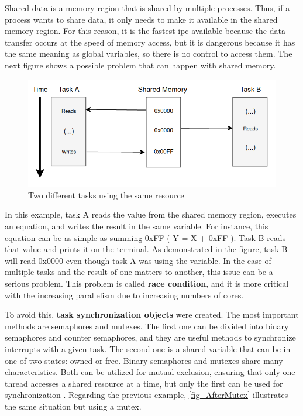 Shared data is a memory region that is shared by multiple processes. Thus, if a process wants to share data, it only needs to make it 
available in the shared memory region. For this reason, it is the fastest \gls{ipc} available because the data transfer occurs at the speed of 
memory access, but it is dangerous because it has the same meaning as global variables, so there is no control to access them. The next figure 
shows a possible problem that can happen with shared memory.

\begin{figure}[H]
	\centering
 	\includegraphics[width=0.7\linewidth]{Images/BeforeMutex.png}
 	\caption{ Two different tasks using the same resource }
	 \label{fig_BeforeMutex}
\end{figure}

In this example, task A reads the value from the shared memory region, executes an equation, and writes the result in the same variable. For 
instance, this equation can be as simple as summing 0xFF ( Y = X + 0xFF ). Task B reads that value and prints it on the terminal. As demonstrated 
in the figure, task B will read 0x0000 even though task A was using the variable. In the case of multiple tasks and the result of one matters to 
another, this issue can be a serious problem. This problem is called \textbf{race condition}, and it is more critical with the increasing 
parallelism due to increasing numbers of cores.

To avoid this, \textbf{task synchronization objects} were created. The most important methods are semaphores and mutexes. The first one can be 
divided into binary semaphores and counter semaphores, and they are useful methods to synchronize interrupts with a given task. The second one is 
a shared variable that can be in one of two states: owned or free. Binary semaphores and mutexes share many characteristics. Both can be utilized 
for mutual exclusion, ensuring that only one thread accesses a shared resource at a time, but only the first can be used for synchronization 
\cite{OSbook2}. Regarding the previous example, \autoref{fig_AfterMutex} illustrates the same situation but using a mutex.

